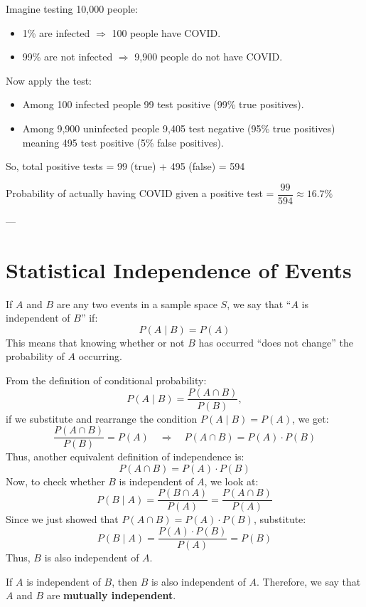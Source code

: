 \documentclass[twoside]{book}
\begin{document}
Imagine testing 10{,}000 people:

\begin{itemize}
    \item 1\% are infected $\Rightarrow$ 100 people have COVID.
    \item 99\% are not infected $\Rightarrow$ 9{,}900 people do not have COVID.
\end{itemize}

Now apply the test:

\begin{itemize}
    \item Among 100 infected people 99 test positive (99\% true positives).
    \item Among 9{,}900 uninfected people 9{,}405 test negative (95\% true positives) meaning 495 test positive (5\% false positives).
\end{itemize}

\noindent
So, total positive tests = 99 (true) + 495 (false) = 594

Probability of actually having COVID given a positive test = $ \dfrac{99}{594} \approx 16.7\% $

---

\section{Statistical Independence of Events}

If $A$ and $B$ are any two events in a sample space $S$, we say that ``$A$ is independent of $B$'' if:
$$
P(A \mid B) = P(A)
$$
This means that knowing whether or not $B$ has occurred ``does not change'' the probability of $A$ occurring.

From the definition of conditional probability:
$$
P(A \mid B) = \frac{P(A \cap B)}{P(B)},
$$
if we substitute and rearrange the condition $P(A \mid B) = P(A)$, we get:
$$
\frac{P(A \cap B)}{P(B)} = P(A) \quad \Rightarrow \quad P(A \cap B) = P(A) \cdot P(B)
$$
Thus, another equivalent definition of independence is:
$$
P(A \cap B) = P(A) \cdot P(B)
$$
Now, to check whether $B$ is independent of $A$, we look at:
$$
P(B \mid A) = \frac{P(B \cap A)}{P(A)} = \frac{P(A \cap B)}{P(A)}
$$
Since we just showed that $P(A \cap B) = P(A) \cdot P(B)$, substitute:
$$
P(B \mid A) = \frac{P(A) \cdot P(B)}{P(A)} = P(B)
$$
Thus, $B$ is also independent of $A$.

\begin{textbox}
If \( A \) is independent of \( B \), then \( B \) is also independent of \( A \). Therefore, we say that \( A \) and \( B \) are \textbf{mutually independent}.
\end{textbox}
\end{document}
